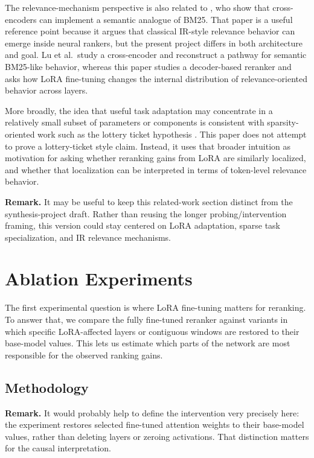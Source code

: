 \documentclass[10pt]{article}
\newcommand{\remark}[1]{{\color{blue}\textbf{Remark.} #1}}
\begin{document}
The relevance-mechanism perspective is also related to \citet{lu2025pathway}, who show that cross-encoders can implement a semantic analogue of BM25.
That paper is a useful reference point because it argues that classical IR-style relevance behavior can emerge inside neural rankers, but the present project differs in both architecture and goal.
Lu et al.\ study a cross-encoder and reconstruct a pathway for semantic BM25-like behavior, whereas this paper studies a decoder-based reranker and asks how LoRA fine-tuning changes the internal distribution of relevance-oriented behavior across layers.

More broadly, the idea that useful task adaptation may concentrate in a relatively small subset of parameters or components is consistent with sparsity-oriented work such as the lottery ticket hypothesis \citep{frankle2019lottery}.
This paper does not attempt to prove a lottery-ticket style claim.
Instead, it uses that broader intuition as motivation for asking whether reranking gains from LoRA are similarly localized, and whether that localization can be interpreted in terms of token-level relevance behavior.

\remark{It may be useful to keep this related-work section distinct from the synthesis-project draft. Rather than reusing the longer probing/intervention framing, this version could stay centered on LoRA adaptation, sparse task specialization, and IR relevance mechanisms.}

\section{Ablation Experiments}

The first experimental question is where LoRA fine-tuning matters for reranking.
To answer that, we compare the fully fine-tuned reranker against variants in which specific LoRA-affected layers or contiguous windows are restored to their base-model values.
This lets us estimate which parts of the network are most responsible for the observed ranking gains.

\subsection{Methodology}

\remark{It would probably help to define the intervention very precisely here: the experiment restores selected fine-tuned attention weights to their base-model values, rather than deleting layers or zeroing activations. That distinction matters for the causal interpretation.}
\end{document}
